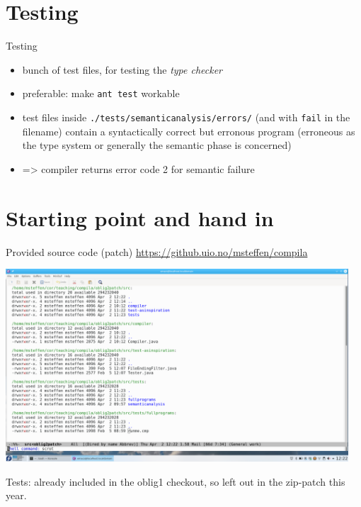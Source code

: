 \documentclass{beamer}
\begin{document}
\section{Testing}
\label{sec:org139e0b9}
\begin{frame}[label={sec:org886977f},fragile]{Testing}
 \begin{itemize}
\item bunch of test files, for testing the \emph{type checker}
\item preferable: make \texttt{ant test} workable

\item test files inside \texttt{./tests/semanticanalysis/errors/} (and with \texttt{fail} in
the filename) contain a syntactically correct but erronous program
(erroneous as the type system or generally the semantic phase is
concerned)

\item => compiler returns error code 2 for semantic failure
\end{itemize}
\end{frame}



\section{Starting point and hand in}
\label{sec:org4290268}
\begin{frame}[label={sec:org1d34188}]{Provided source code (patch)}
\url{https://github.uio.no/msteffen/compila}

\includegraphics[width=0.96\textwidth]{figures/snaps/directorystructure-src}

Tests: already included in the oblig1 checkout, so left out in the zip-patch
this year.
\end{frame}
\end{document}
